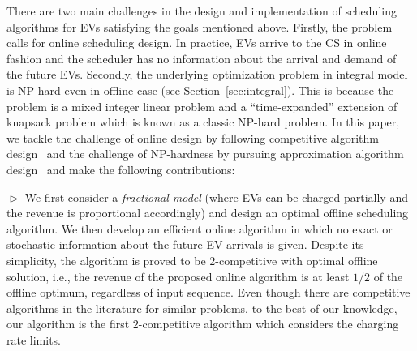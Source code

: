 \documentclass[journal]{IEEEtran}
\newcommand{\rev}[1]{{\color{black}#1}}%
\newcommand{\rev}[1]{#1}
\begin{document}

There are two main challenges in the design and implementation of scheduling algorithms for EVs satisfying the goals mentioned above. \rev{Firstly, the problem calls for online scheduling design.} In practice, EVs arrive to the CS in online fashion and the scheduler has no information about the arrival and demand of the future EVs. Secondly, the underlying optimization problem in integral model is NP-hard even in offline case \rev{(see Section~\ref{sec:integral})}. This is because the problem is a mixed integer linear problem and a ``time-expanded'' extension of knapsack problem which is known as a classic NP-hard problem. In this paper, we tackle the challenge of online design by following competitive algorithm design~\cite{borodin2005online} and the challenge of NP-hardness by pursuing approximation algorithm design~\cite{approx} and make the following contributions: 

$\vartriangleright$ We first consider a \textit{fractional model} (where EVs can be charged partially and the revenue is proportional accordingly) and design an optimal offline scheduling algorithm. 
We then develop an efficient online algorithm in which no exact or stochastic information about the future EV arrivals is given. Despite its simplicity, the algorithm is proved to be $2$-competitive with optimal offline solution, i.e., the revenue of the proposed online algorithm is at least $1/2$ of the offline optimum, regardless of input sequence. 
Even though there are competitive algorithms in the literature for similar problems, to the best of our knowledge, our algorithm is the first $2$-competitive algorithm \rev{which considers the} charging rate limits.
\end{document}
